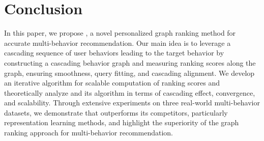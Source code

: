 \section{Conclusion}
\label{sec:conclusion}
In this paper, we propose \method, a novel personalized graph ranking method for accurate multi-behavior recommendation. 
Our main idea is to leverage a cascading sequence of user behaviors leading to the target behavior by constructing a cascading behavior graph and measuring ranking scores along the graph, ensuring smoothness, query fitting, and cascading alignment.
We develop an iterative algorithm for scalable computation of ranking scores and theoretically analyze \method and its algorithm in terms of cascading effect, convergence, and scalability.
Through extensive experiments on three real-world multi-behavior datasets, we demonstrate that \method outperforms its competitors, particularly representation learning methods, and highlight the superiority of the graph ranking approach for multi-behavior recommendation.

